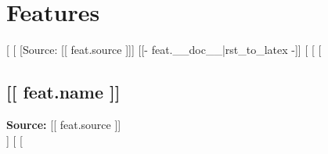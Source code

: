 \section*{Features}
[%
  [%
    [Source: [[ feat.source ]]]
    [[- feat.__doc__|rst_to_latex -]]
  [%
[%
  [%
    \subsection*{[[ feat.name ]]}
    \textbf{Source:} [[ feat.source ]] \\
    [%
      \textbf{**Not included in stats on Character Sheet}
    [%
    [[- feat.__doc__|rst_to_latex -]]
  [%
[%
